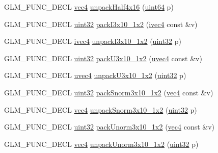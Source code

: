 \begin{CompactItemize}
\item 
GLM\_\-FUNC\_\-DECL \hyperlink{group__core__types_g5881b1b022d7fd1b7218f5916532dd02}{vec4} \hyperlink{group__gtc__packing_gea526d6491ad40401eac34803984bf27}{unpackHalf4x16} (\hyperlink{group__gtc__type__precision_ge3632bf9b37da66233d78930dd06378a}{uint64} p)
\item 
GLM\_\-FUNC\_\-DECL \hyperlink{group__gtc__type__precision_g202b6a53c105fcb7e531f9b443518451}{uint32} \hyperlink{group__gtc__packing_g032e18fa5bc5b8f3897104aeb2f1e195}{packI3x10\_\-1x2} (\hyperlink{group__core__types_ga4560ddc50320ea8f8a70d5c9c249fea}{ivec4} const \&v)
\item 
GLM\_\-FUNC\_\-DECL \hyperlink{group__core__types_ga4560ddc50320ea8f8a70d5c9c249fea}{ivec4} \hyperlink{group__gtc__packing_g08bcd34cf9c34701d658dd861ee6e300}{unpackI3x10\_\-1x2} (\hyperlink{group__gtc__type__precision_g202b6a53c105fcb7e531f9b443518451}{uint32} p)
\item 
GLM\_\-FUNC\_\-DECL \hyperlink{group__gtc__type__precision_g202b6a53c105fcb7e531f9b443518451}{uint32} \hyperlink{group__gtc__packing_gf656d8862628f96b20de7a36eaa1fe56}{packU3x10\_\-1x2} (\hyperlink{group__core__types_g1c426d19627b32b14f0089f7f4ba7b1d}{uvec4} const \&v)
\item 
GLM\_\-FUNC\_\-DECL \hyperlink{group__core__types_g1c426d19627b32b14f0089f7f4ba7b1d}{uvec4} \hyperlink{group__gtc__packing_g119aa2d7d55952f9dc4214390a6ffefc}{unpackU3x10\_\-1x2} (\hyperlink{group__gtc__type__precision_g202b6a53c105fcb7e531f9b443518451}{uint32} p)
\item 
GLM\_\-FUNC\_\-DECL \hyperlink{group__gtc__type__precision_g202b6a53c105fcb7e531f9b443518451}{uint32} \hyperlink{group__gtc__packing_g0d4157cec37c0312216a7be1cc92df54}{packSnorm3x10\_\-1x2} (\hyperlink{group__core__types_g5881b1b022d7fd1b7218f5916532dd02}{vec4} const \&v)
\item 
GLM\_\-FUNC\_\-DECL \hyperlink{group__core__types_g5881b1b022d7fd1b7218f5916532dd02}{vec4} \hyperlink{group__gtc__packing_g8b8bb827a3743ca553d8702d3e337101}{unpackSnorm3x10\_\-1x2} (\hyperlink{group__gtc__type__precision_g202b6a53c105fcb7e531f9b443518451}{uint32} p)
\item 
GLM\_\-FUNC\_\-DECL \hyperlink{group__gtc__type__precision_g202b6a53c105fcb7e531f9b443518451}{uint32} \hyperlink{group__gtc__packing_g2cf2d11b40bd48639110456fd74c2e33}{packUnorm3x10\_\-1x2} (\hyperlink{group__core__types_g5881b1b022d7fd1b7218f5916532dd02}{vec4} const \&v)
\item 
GLM\_\-FUNC\_\-DECL \hyperlink{group__core__types_g5881b1b022d7fd1b7218f5916532dd02}{vec4} \hyperlink{group__gtc__packing_gf69ace2b5e9234f8afb4e99c3df1193d}{unpackUnorm3x10\_\-1x2} (\hyperlink{group__gtc__type__precision_g202b6a53c105fcb7e531f9b443518451}{uint32} p)

\end{CompactItemize}
